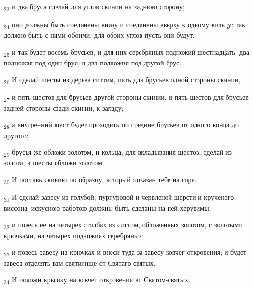 \begin{tcolorbox}
\textsubscript{23} и два бруса сделай для углов скинии на заднюю сторону;
\end{tcolorbox}
\begin{tcolorbox}
\textsubscript{24} они должны быть соединены внизу и соединены вверху к одному кольцу: так должно быть с ними обоими; для обоих углов пусть они будут;
\end{tcolorbox}
\begin{tcolorbox}
\textsubscript{25} и так будет восемь брусьев, и для них серебряных подножий шестнадцать: два подножия под один брус, и два подножия под другой брус.
\end{tcolorbox}
\begin{tcolorbox}
\textsubscript{26} И сделай шесты из дерева ситтим, пять для брусьев одной стороны скинии,
\end{tcolorbox}
\begin{tcolorbox}
\textsubscript{27} и пять шестов для брусьев другой стороны скинии, и пять шестов для брусьев задней стороны сзади скинии, к западу;
\end{tcolorbox}
\begin{tcolorbox}
\textsubscript{28} а внутренний шест будет проходить по средине брусьев от одного конца до другого;
\end{tcolorbox}
\begin{tcolorbox}
\textsubscript{29} брусья же обложи золотом, и кольца, для вкладывания шестов, сделай из золота, и шесты обложи золотом.
\end{tcolorbox}
\begin{tcolorbox}
\textsubscript{30} И поставь скинию по образцу, который показан тебе на горе.
\end{tcolorbox}
\begin{tcolorbox}
\textsubscript{31} И сделай завесу из голубой, пурпуровой и червленой шерсти и крученого виссона; искусною работою должны быть сделаны на ней херувимы;
\end{tcolorbox}
\begin{tcolorbox}
\textsubscript{32} и повесь ее на четырех столбах из ситтим, обложенных золотом, с золотыми крючками, на четырех подножиях серебряных;
\end{tcolorbox}
\begin{tcolorbox}
\textsubscript{33} и повесь завесу на крючках и внеси туда за завесу ковчег откровения; и будет завеса отделять вам святилище от Святаго-святых.
\end{tcolorbox}
\begin{tcolorbox}
\textsubscript{34} И положи крышку на ковчег откровения во Святом-святых.
\end{tcolorbox}
